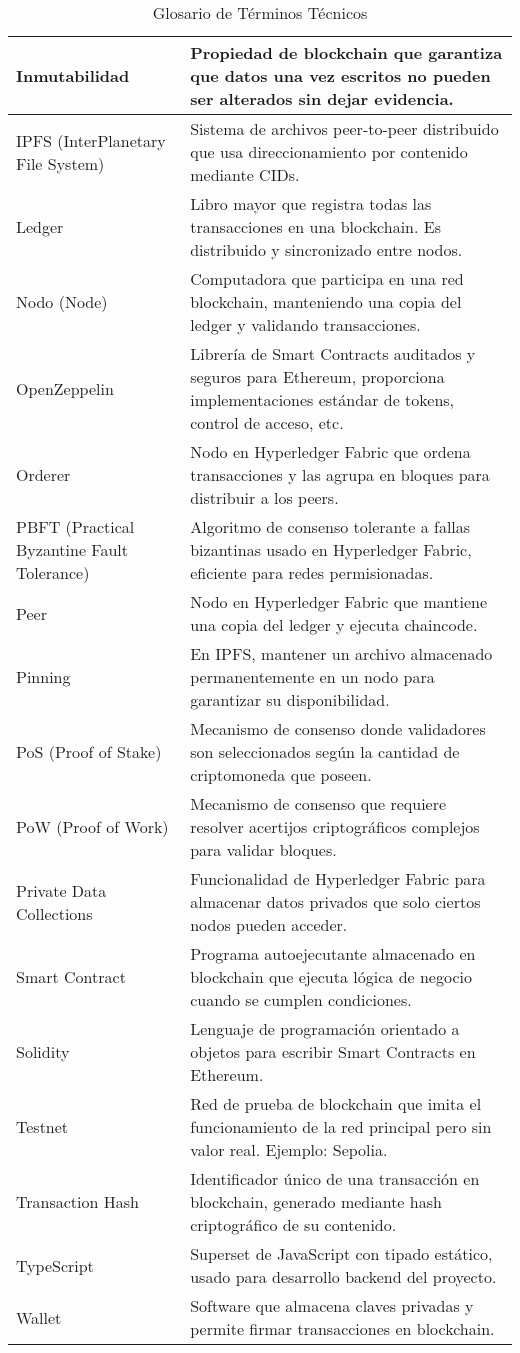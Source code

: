 \begin{table}[h]
\begin{tabular}{|p{3.5cm}|p{10.5cm}|}
Inmutabilidad & Propiedad de blockchain que garantiza que datos una vez escritos no pueden ser alterados sin dejar evidencia. \\ \hline
IPFS (InterPlanetary File System) & Sistema de archivos peer-to-peer distribuido que usa direccionamiento por contenido mediante CIDs. \\ \hline
Ledger & Libro mayor que registra todas las transacciones en una blockchain. Es distribuido y sincronizado entre nodos. \\ \hline
Nodo (Node) & Computadora que participa en una red blockchain, manteniendo una copia del ledger y validando transacciones. \\ \hline
OpenZeppelin & Librería de Smart Contracts auditados y seguros para Ethereum, proporciona implementaciones estándar de tokens, control de acceso, etc. \\ \hline
Orderer & Nodo en Hyperledger Fabric que ordena transacciones y las agrupa en bloques para distribuir a los peers. \\ \hline
PBFT (Practical Byzantine Fault Tolerance) & Algoritmo de consenso tolerante a fallas bizantinas usado en Hyperledger Fabric, eficiente para redes permisionadas. \\ \hline
Peer & Nodo en Hyperledger Fabric que mantiene una copia del ledger y ejecuta chaincode. \\ \hline
Pinning & En IPFS, mantener un archivo almacenado permanentemente en un nodo para garantizar su disponibilidad. \\ \hline
PoS (Proof of Stake) & Mecanismo de consenso donde validadores son seleccionados según la cantidad de criptomoneda que poseen. \\ \hline
PoW (Proof of Work) & Mecanismo de consenso que requiere resolver acertijos criptográficos complejos para validar bloques. \\ \hline
Private Data Collections & Funcionalidad de Hyperledger Fabric para almacenar datos privados que solo ciertos nodos pueden acceder. \\ \hline
Smart Contract & Programa autoejecutante almacenado en blockchain que ejecuta lógica de negocio cuando se cumplen condiciones. \\ \hline
Solidity & Lenguaje de programación orientado a objetos para escribir Smart Contracts en Ethereum. \\ \hline
Testnet & Red de prueba de blockchain que imita el funcionamiento de la red principal pero sin valor real. Ejemplo: Sepolia. \\ \hline
Transaction Hash & Identificador único de una transacción en blockchain, generado mediante hash criptográfico de su contenido. \\ \hline
TypeScript & Superset de JavaScript con tipado estático, usado para desarrollo backend del proyecto. \\ \hline
Wallet & Software que almacena claves privadas y permite firmar transacciones en blockchain. \\ \hline
\end{tabular}
\caption{Glosario de Términos Técnicos}
\end{table}
